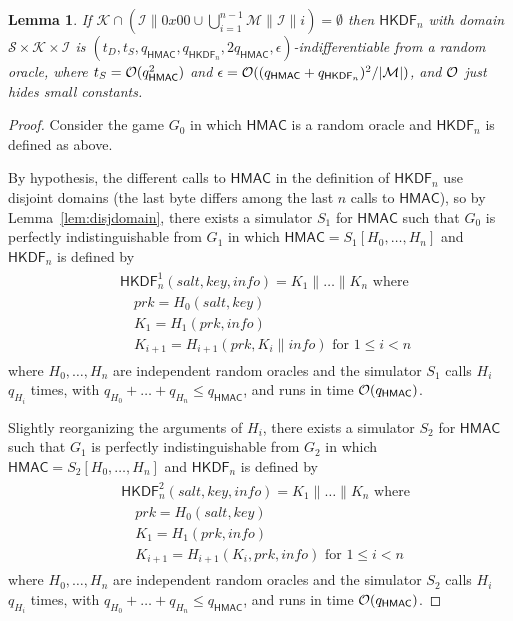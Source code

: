 \documentclass[compsoc, conference, letterpaper, 10pt, times]{IEEEtran}
\newcommand{\HKDF}{\mathsf{HKDF}}
\newtheorem{lemma}{Lemma}
\newcommand{\salt}{\mathit{salt}}
\newcommand{\key}{\mathit{key}}
\newcommand{\info}{\mathit{info}}
\newcommand{\prk}{\mathit{prk}}
\newcommand{\hmac}{\mathsf{HMAC}}
\newcommand{\Ssalt}{\mathcal{S}}
\newcommand{\Skey}{\mathcal{K}}
\newcommand{\Sinfo}{\mathcal{I}}
\newcommand{\Smac}{\mathcal{M}}
\newcommand{\ab}{\allowbreak}
\begin{document}
\begin{lemma}\label{lem:hkdfindif}
If $\Skey \cap (\Sinfo \| 0x00 \cup \bigcup_{i = 1}^{n-1}\Smac \| \Sinfo \| i) = \emptyset$
then $\HKDF_n$ with domain $\Ssalt \times \Skey \times \Sinfo$ is
$(t_D, \ab t_S, \ab q_{\hmac}, \ab q_{\HKDF_n}, \ab 2q_{\hmac}, \ab \epsilon)$-indifferentiable from a random oracle,
where $t_S = {\cal O}(q_{\hmac}^2)$ and $\epsilon = {\cal O}((q_{\hmac} + q_{\HKDF_n})^2/|\Smac|)$,
and ${\cal O}$ just hides small constants.
\end{lemma}
\begin{proof}
Consider the game $G_0$ in which $\hmac$ is a random oracle and $\HKDF_n$
is defined as above.

By hypothesis, the different calls to $\hmac$ in the definition of 
$\HKDF_n$ use disjoint domains (the last byte differs among the last
$n$ calls to $\hmac$), so by Lemma~\ref{lem:disjdomain}, there exists
a simulator $S_1$ for $\hmac$ such that $G_0$ is
perfectly indistinguishable from $G_1$ in which
$\hmac = S_1[H_0, \ldots, H_n]$ and $\HKDF_n$ is defined by
\begin{align*}
\begin{split}
&\HKDF^1_n(\salt,\key,\info) = K_1 \| \dots \| K_n \text{ where}\\
&\quad \prk = H_0(\salt,\key)\\
&\quad K_1 = H_1(\prk, \info )\\
&\quad K_{i+1} = H_{i+1}(\prk, K_i \| \info) \text{ for }1 \leq i < n
\end{split}
\end{align*}
where $H_0, \dots, H_n$ are independent random oracles
and the simulator $S_1$ calls $H_i$ $q_{H_i}$ times, with
$q_{H_0} + \dots + q_{H_n} \leq q_{\hmac}$, and runs in time 
${\cal O}(q_{\hmac})$.

Slightly reorganizing the arguments of $H_i$, there exists a simulator $S_2$
for $\hmac$ such that $G_1$ is
perfectly indistinguishable from $G_2$ in which
$\hmac = S_2[H_0, \ldots, H_n]$ and $\HKDF_n$ is defined by
\begin{align*}
\begin{split}
&\HKDF^2_n(\salt,\key,\info) = K_1 \| \dots \| K_n \text{ where}\\
&\quad \prk = H_0(\salt,\key)\\
&\quad K_1 = H_1(\prk, \info )\\
&\quad K_{i+1} = H_{i+1}(K_i, \prk, \info) \text{ for }1 \leq i < n
\end{split}
\end{align*}
where $H_0, \dots, H_n$ are independent random oracles
and the simulator $S_2$ calls $H_i$ $q_{H_i}$ times, with
$q_{H_0} + \dots + q_{H_n} \leq q_{\hmac}$, and runs in time 
${\cal O}(q_{\hmac})$.


\end{proof}
\end{document}
